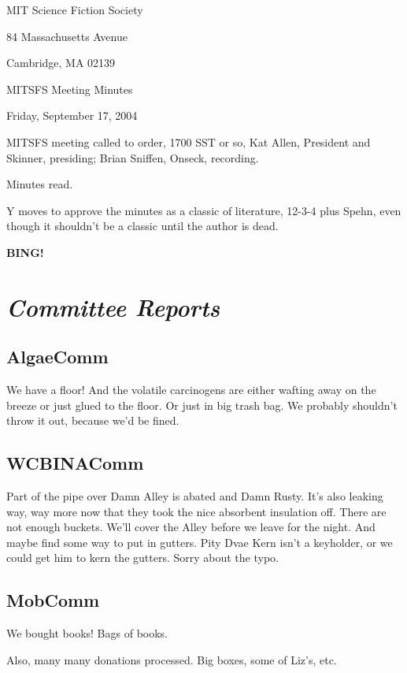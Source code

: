 \documentclass[10pt]{article}
\newcommand{\bing}{{\bf BING!} }
\newcommand{\goto}[1]{\bing \vskip 12pt \section*{{\em{#1}}}}
\newcommand{\ps}{ plus Spehn\xspace}
\begin{document}
\begin{center}

MIT Science Fiction Society 

84 Massachusetts Avenue

Cambridge, MA 02139

\vspace{12pt}

MITSFS Meeting Minutes 

Friday, September 17, 2004

\end{center}
 
\vspace{18pt}

\setlength{\parskip}{6pt}

\noindent
MITSFS meeting called to order, 1700 SST or so, Kat Allen, President and
Skinner, presiding; Brian Sniffen,  Onseck, recording.

Minutes read.

Y moves to approve the minutes as a classic of literature, 12-3-4\ps, even though it shouldn't be a classic until the author is dead.

\goto{Committee Reports}
\subsection*{AlgaeComm}
We have a floor!  And the volatile carcinogens are either wafting away
on the breeze or just glued to the floor.  Or just in big trash bag.
We probably shouldn't throw it out, because we'd be fined.

\subsection*{WCBINAComm}
Part of the pipe over Damn Alley is abated and Damn Rusty.  It's also
leaking way, way more now that they took the nice absorbent insulation
off.  There are not enough buckets.  We'll cover the Alley before we
leave for the night.  And maybe find some way to put in gutters.  Pity
Dvae Kern isn't a keyholder, or we could get him to kern the gutters.
Sorry about the typo.

\subsection*{MobComm}
We bought books!  Bags of books.

Also, many many donations processed.  Big boxes, some of Liz's, etc.
\end{document}
